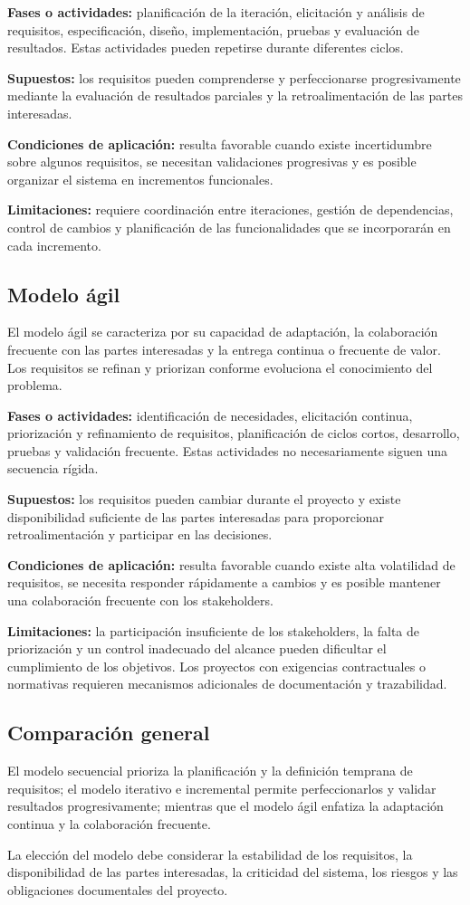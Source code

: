 \textbf{Fases o actividades:} planificación de la iteración, elicitación y análisis de requisitos, especificación, diseño, implementación, pruebas y evaluación de resultados. Estas actividades pueden repetirse durante diferentes ciclos.

\textbf{Supuestos:} los requisitos pueden comprenderse y perfeccionarse progresivamente mediante la evaluación de resultados parciales y la retroalimentación de las partes interesadas.

\textbf{Condiciones de aplicación:} resulta favorable cuando existe incertidumbre sobre algunos requisitos, se necesitan validaciones progresivas y es posible organizar el sistema en incrementos funcionales.

\textbf{Limitaciones:} requiere coordinación entre iteraciones, gestión de dependencias, control de cambios y planificación de las funcionalidades que se incorporarán en cada incremento.

\subsection{Modelo ágil}

El modelo ágil se caracteriza por su capacidad de adaptación, la colaboración frecuente con las partes interesadas y la entrega continua o frecuente de valor. Los requisitos se refinan y priorizan conforme evoluciona el conocimiento del problema.

\textbf{Fases o actividades:} identificación de necesidades, elicitación continua, priorización y refinamiento de requisitos, planificación de ciclos cortos, desarrollo, pruebas y validación frecuente. Estas actividades no necesariamente siguen una secuencia rígida.

\textbf{Supuestos:} los requisitos pueden cambiar durante el proyecto y existe disponibilidad suficiente de las partes interesadas para proporcionar retroalimentación y participar en las decisiones.

\textbf{Condiciones de aplicación:} resulta favorable cuando existe alta volatilidad de requisitos, se necesita responder rápidamente a cambios y es posible mantener una colaboración frecuente con los stakeholders.

\textbf{Limitaciones:} la participación insuficiente de los stakeholders, la falta de priorización y un control inadecuado del alcance pueden dificultar el cumplimiento de los objetivos. Los proyectos con exigencias contractuales o normativas requieren mecanismos adicionales de documentación y trazabilidad.

\subsection{Comparación general}

El modelo secuencial prioriza la planificación y la definición temprana de requisitos; el modelo iterativo e incremental permite perfeccionarlos y validar resultados progresivamente; mientras que el modelo ágil enfatiza la adaptación continua y la colaboración frecuente.

La elección del modelo debe considerar la estabilidad de los requisitos, la disponibilidad de las partes interesadas, la criticidad del sistema, los riesgos y las obligaciones documentales del proyecto.
